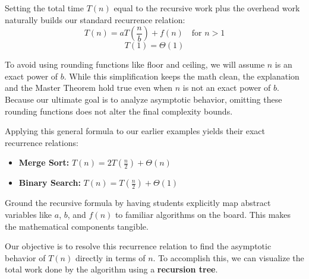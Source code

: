 \documentclass[11pt, a4paper]{article}
\begin{document}
Setting the total time $T(n)$ equal to the recursive work plus the overhead work naturally builds our standard recurrence relation:
\[ T(n) = aT\left(\frac{n}{b}\right) + f(n) \quad \text{for } n > 1 \]
\[ T(1) = \Theta(1) \]

 To avoid using rounding functions like floor and ceiling, we will assume $n$ is an exact power of $b$. While this simplification keeps the math clean, the explanation and the Master Theorem hold true even when $n$ is not an exact power of $b$. Because our ultimate goal is to analyze asymptotic behavior, omitting these rounding functions does not alter the final complexity bounds.

Applying this general formula to our earlier examples yields their exact recurrence relations:
\begin{itemize}
    \item \textbf{Merge Sort:} $T(n) = 2T\left(\frac{n}{2}\right) + \Theta(n)$
    \item \textbf{Binary Search:} $T(n) = T\left(\frac{n}{2}\right) + \Theta(1)$
\end{itemize}

\begin{educatortip}
Ground the recursive formula by having students explicitly map abstract variables like $a$, $b$, and $f(n)$ to familiar algorithms on the board. This makes the mathematical components tangible.
\end{educatortip}

Our objective is to resolve this recurrence relation to find the asymptotic behavior of $T(n)$ directly in terms of $n$. To accomplish this, we can visualize the total work done by the algorithm using a \textbf{recursion tree}.

\newpage
\end{document}
